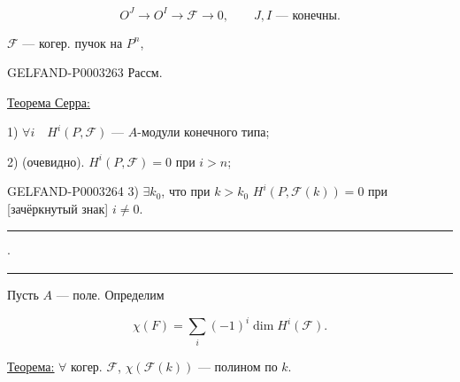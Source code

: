\begin{equation*}O^J\longrightarrow O^I\longrightarrow\mathcal F\longrightarrow0,\qquad J,I\text{ --- конечны}.\end{equation*}

$\mathcal F$ --- когер. пучок на $P^n$,

\begin{GelfandAdjacentEvidence}{GELFAND-P000326}{3}
Рассм.





\end{GelfandAdjacentEvidence}


\uline{\uline{Теорема Серра:}}

1) $\forall i\quad H^i(P,\mathcal F)$ --- $A$-модули конечного типа;

2) (очевидно). $H^i(P,\mathcal F)=0$ при $i>n$;

\begin{GelfandAdjacentEvidence}{GELFAND-P000326}{4}
3) $\exists k_0$, что при $k>k_0$ $H^i(P,\mathcal F(k))=0$ при [зачёркнутый знак] $i\ne0$.

\end{GelfandAdjacentEvidence}


\begin{center}\rule{20mm}{.4pt}\quad$\cdot$\quad\rule{20mm}{.4pt}\end{center}

Пусть $A$ --- поле. Определим

\begin{equation*}\chi(F)=\sum_i(-1)^i\dim H^i(\mathcal F).\end{equation*}

\uline{\uline{Теорема:}} $\forall$ когер. $\mathcal F$, $\chi(\mathcal F(k))$ --- полином по $k$.

